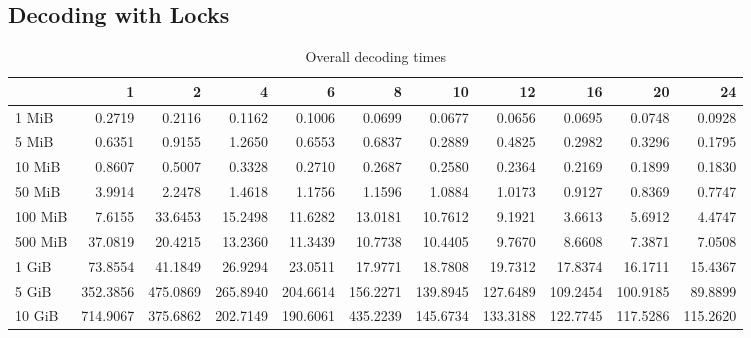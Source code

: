 \subsection{Decoding with Locks}
\begin{table}[!h]
	\caption{Overall decoding times}
\begin{tabular}{lrrrrrrrrrr}
	\toprule
		\diagbox{File sizes }{Threads}  &        1  &        2  &        4  &        6  &        8  &        10 &        12 &        16 &        20 &        24 \\
	\midrule
	1 MiB   &    0.2719 &    0.2116 &    0.1162 &    0.1006 &    0.0699 &    0.0677 &    0.0656 &    0.0695 &    0.0748 &    0.0928 \\
	5 MiB   &    0.6351 &    0.9155 &    1.2650 &    0.6553 &    0.6837 &    0.2889 &    0.4825 &    0.2982 &    0.3296 &    0.1795 \\
	10 MiB  &    0.8607 &    0.5007 &    0.3328 &    0.2710 &    0.2687 &    0.2580 &    0.2364 &    0.2169 &    0.1899 &    0.1830 \\
	50 MiB  &    3.9914 &    2.2478 &    1.4618 &    1.1756 &    1.1596 &    1.0884 &    1.0173 &    0.9127 &    0.8369 &    0.7747 \\
	100 MiB &    7.6155 &   33.6453 &   15.2498 &   11.6282 &   13.0181 &   10.7612 &    9.1921 &    3.6613 &    5.6912 &    4.4747 \\
	500 MiB &   37.0819 &   20.4215 &   13.2360 &   11.3439 &   10.7738 &   10.4405 &    9.7670 &    8.6608 &    7.3871 &    7.0508 \\
	1 GiB   &   73.8554 &   41.1849 &   26.9294 &   23.0511 &   17.9771 &   18.7808 &   19.7312 &   17.8374 &   16.1711 &   15.4367 \\
	5 GiB   &  352.3856 &  475.0869 &  265.8940 &  204.6614 &  156.2271 &  139.8945 &  127.6489 &  109.2454 &  100.9185 &   89.8899 \\
	10 GiB  &  714.9067 &  375.6862 &  202.7149 &  190.6061 &  435.2239 &  145.6734 &  133.3188 &  122.7745 &  117.5286 &  115.2620 \\
	\bottomrule
\end{tabular}
\end{table}

